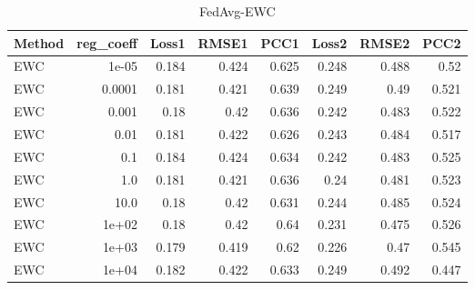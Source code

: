 \begin{table}
\caption{FedAvg-EWC}
\begin{tabular}{lrrrrrrr}
\toprule
Method & reg_coeff & Loss1 & RMSE1 & PCC1 & Loss2 & RMSE2 & PCC2 \\
\midrule
EWC & 1e-05 & 0.184 & 0.424 & 0.625 & 0.248 & 0.488 & 0.52 \\
EWC & 0.0001 & 0.181 & 0.421 & 0.639 & 0.249 & 0.49 & 0.521 \\
EWC & 0.001 & 0.18 & 0.42 & 0.636 & 0.242 & 0.483 & 0.522 \\
EWC & 0.01 & 0.181 & 0.422 & 0.626 & 0.243 & 0.484 & 0.517 \\
EWC & 0.1 & 0.184 & 0.424 & 0.634 & 0.242 & 0.483 & 0.525 \\
EWC & 1.0 & 0.181 & 0.421 & 0.636 & 0.24 & 0.481 & 0.523 \\
EWC & 10.0 & 0.18 & 0.42 & 0.631 & 0.244 & 0.485 & 0.524 \\
EWC & 1e+02 & 0.18 & 0.42 & 0.64 & 0.231 & 0.475 & 0.526 \\
EWC & 1e+03 & 0.179 & 0.419 & 0.62 & 0.226 & 0.47 & 0.545 \\
EWC & 1e+04 & 0.182 & 0.422 & 0.633 & 0.249 & 0.492 & 0.447 \\
\bottomrule
\end{tabular}
\end{table}
